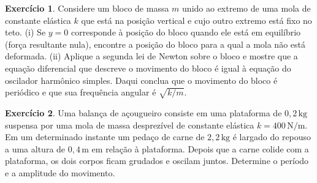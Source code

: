 \documentclass[12pt,a4paper]{article}
\theoremstyle{definition}
\newtheorem{ex}{Exercício}[section]
\begin{document}
\begin{ex}
  Considere um bloco de massa $m$ unido ao extremo de uma mola de
  constante elástica $k$ que está na posição vertical e cujo outro
  extremo está fixo no teto. (i) Se $y=0$ corresponde à posição do
  bloco quando ele está em equilíbrio (força resultante nula),
  encontre a posição do bloco para a qual a mola não está
  deformada. (ii) Aplique a segunda lei de Newton sobre o bloco e
  mostre que a equação diferencial que descreve o movimento do bloco é
  igual à equação do oscilador harmônico simples. Daqui conclua que o
  movimento do bloco é periódico e que sua frequência angular é
  $\sqrt{k/m}$.
\end{ex}

\begin{ex}
  Uma balança de açougueiro consiste em uma plataforma de
  $0{,}2\,\mathrm{kg}$ suspensa por uma mola de massa desprezível de
  constante elástica $k=400\,\mathrm{N/m}$. Em um determinado instante
  um pedaço de carne de $2{,}2\,\mathrm{kg}$ é largado do repouso a
  uma altura de $0{,}4\,\mathrm{m}$ em relação à plataforma. Depois
  que a carne colide com a plataforma, os dois corpos ficam grudados e
  oscilam juntos. Determine o período e a amplitude do movimento.
\end{ex}
\end{document}
